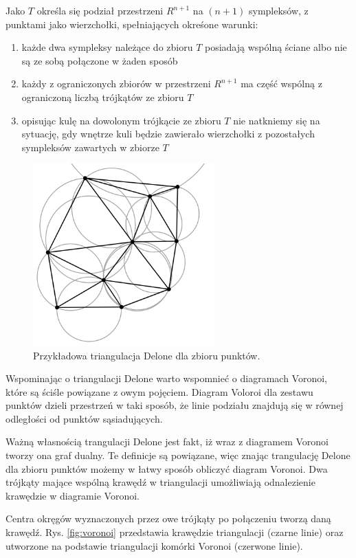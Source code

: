 Jako $T$ określa się podział przestrzeni $R^{n+1}$ na $(n+1)$ sympleksów, z punktami jako wierzchołki, spełniających okreśone warunki:

\begin{enumerate}
    \item każde dwa sympleksy należące do zbioru $T$ posiadają wspólną ściane albo nie są ze sobą połączone w żaden sposób
    \item każdy z ograniczonych zbiorów w przestrzeni $R^{n+1}$ ma część wspólną z ograniczoną liczbą trójkątów ze zbioru $T$
    \item opisując kulę na dowolonym trójkącie ze zbioru $T$ nie natkniemy się na sytuację, gdy wnętrze kuli będzie zawierało wierzchołki z pozostałych sympleksów zawartych w zbiorze $T$
\end{enumerate}

\begin{figure}[h]
	\centering
	\includegraphics[width=7cm]{triangulation.png}
	\caption{Przykładowa triangulacja Delone dla zbioru punktów. \cite{tDelone}}
	\label{fig:delone}
\end{figure}

Wspominając o triangulacji Delone warto wspomnieć o diagramach Voronoi, które są ściśle powiązane z owym pojęciem. Diagram Voloroi dla zestawu punktów dzieli przestrzeń w taki sposób, że linie podziału znajdują się w równej odległości od punktów sąsiadujących.

Ważną własnością trangulacji Delone jest fakt, iż wraz z diagramem Voronoi tworzy ona graf dualny. Te definicje są powiązane, więc znając trangulację Delone dla zbioru punktów możemy w łatwy sposób obliczyć diagram Voronoi. Dwa trójkąty mające wspólną krawędź w triangulacji umożliwiają odnalezienie krawędzie w diagramie Voronoi. 

Centra okręgów wyznaczonych przez owe trójkąty po połączeniu tworzą daną krawędź. Rys. \ref{fig:voronoi}  przedstawia krawędzie triangulacji (czarne linie) oraz utworzone na podstawie triangulacji komórki Voronoi (czerwone linie).


